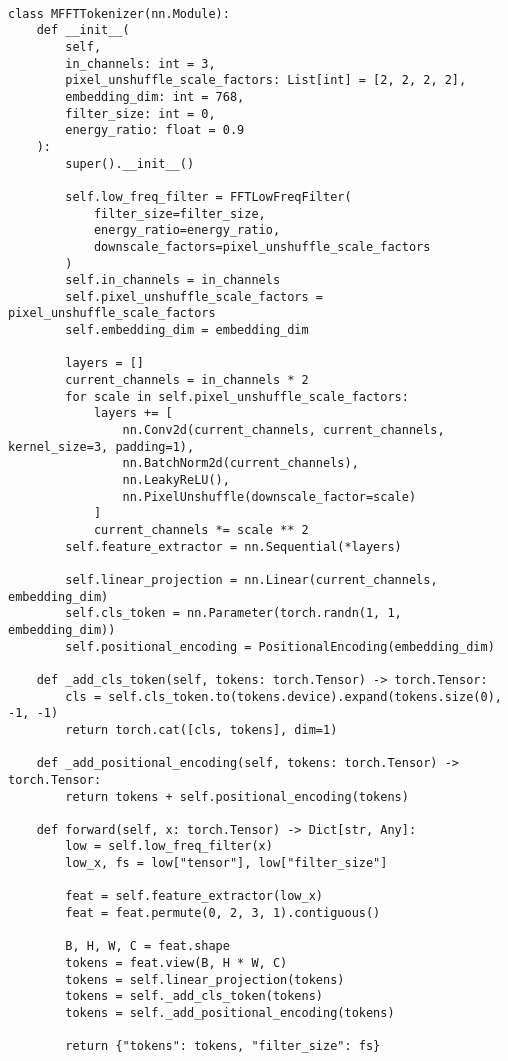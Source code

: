{\scriptsize
\begin{verbatim}

class MFFTTokenizer(nn.Module):
    def __init__(
        self,
        in_channels: int = 3,
        pixel_unshuffle_scale_factors: List[int] = [2, 2, 2, 2],
        embedding_dim: int = 768,
        filter_size: int = 0,
        energy_ratio: float = 0.9
    ):
        super().__init__()

        self.low_freq_filter = FFTLowFreqFilter(
            filter_size=filter_size,
            energy_ratio=energy_ratio,
            downscale_factors=pixel_unshuffle_scale_factors
        )
        self.in_channels = in_channels
        self.pixel_unshuffle_scale_factors = pixel_unshuffle_scale_factors
        self.embedding_dim = embedding_dim

        layers = []
        current_channels = in_channels * 2
        for scale in self.pixel_unshuffle_scale_factors:
            layers += [
                nn.Conv2d(current_channels, current_channels, kernel_size=3, padding=1),
                nn.BatchNorm2d(current_channels),
                nn.LeakyReLU(),
                nn.PixelUnshuffle(downscale_factor=scale)
            ]
            current_channels *= scale ** 2
        self.feature_extractor = nn.Sequential(*layers)

        self.linear_projection = nn.Linear(current_channels, embedding_dim)
        self.cls_token = nn.Parameter(torch.randn(1, 1, embedding_dim))
        self.positional_encoding = PositionalEncoding(embedding_dim)

    def _add_cls_token(self, tokens: torch.Tensor) -> torch.Tensor:
        cls = self.cls_token.to(tokens.device).expand(tokens.size(0), -1, -1)
        return torch.cat([cls, tokens], dim=1)

    def _add_positional_encoding(self, tokens: torch.Tensor) -> torch.Tensor:
        return tokens + self.positional_encoding(tokens)

    def forward(self, x: torch.Tensor) -> Dict[str, Any]:
        low = self.low_freq_filter(x)
        low_x, fs = low["tensor"], low["filter_size"]

        feat = self.feature_extractor(low_x)
        feat = feat.permute(0, 2, 3, 1).contiguous()

        B, H, W, C = feat.shape
        tokens = feat.view(B, H * W, C)
        tokens = self.linear_projection(tokens)
        tokens = self._add_cls_token(tokens)
        tokens = self._add_positional_encoding(tokens)

        return {"tokens": tokens, "filter_size": fs}
\end{verbatim}
}